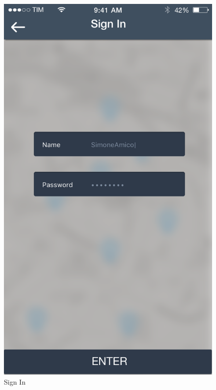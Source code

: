 \documentclass[12pt]{article}
\begin{document}
 	 	\begin{figure}
		 \centering	
		 \includegraphics[scale=0.25]{Images/mobileApp/SignIn.png}
		 \caption{Sign In}
		 \endminipage
		 \centering

\end{figure}
\end{document}
